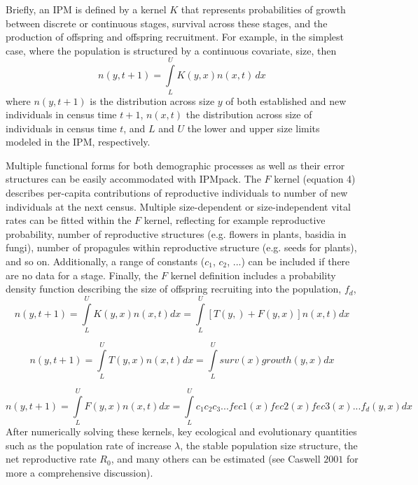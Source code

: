 \documentclass{article}
\begin{document}
Briefly, an IPM is defined by a kernel $K$ that represents probabilities of growth between discrete or continuous stages, survival across these stages, and the production of offspring and offspring recruitment.   For example, in the simplest case, where the population is structured by a continuous covariate, size, then 
\begin{equation}
n(y, t+1) = \int\limits_{L}^{U} K(y, x) n(x, t) \, dx       
\end{equation}
where $n(y, t+1)$ is the distribution across size $y$ of both established and new individuals in census time $t+1$, $n(x, t)$ the distribution across size of individuals in census time $t$, and $L$ and $U$ the lower and upper size limits modeled in the IPM, respectively. 

 Multiple functional forms for both demographic processes as well as their error structures can be easily accommodated with IPMpack. The $F$ kernel (equation 4) describes per-capita contributions of reproductive individuals to number of new individuals at the next census. Multiple size-dependent or size-independent vital rates can be fitted within the $F$ kernel, reflecting for example reproductive probability, number of reproductive structures (e.g. flowers in plants, basidia in fungi), number of propagules within reproductive structure (e.g. seeds for plants), and so on. Additionally, a range of constants ($c_1$, $c_2$, ...) can be included if there are no data for a stage.  Finally, the $F$ kernel definition includes a probability density function describing the size of offspring recruiting into the population, $f_d$, 
\begin{equation}
n(y, t+1) = \int\limits_{L}^{U} K(y, x) n(x, t) dx = \int\limits_{L}^{U}
[T(y, ) + F(y, x)] n(x, t) dx
\end{equation}

\begin{equation}
n(y, t+1) = \int\limits_{L}^{U} T(y, x) n(x, t) dx = \int\limits_{L}^{U}surv(x)growth(y, x)dx    
\end{equation}

\begin{equation}
n(y, t+1) = \int\limits_{L}^{U} F(y, x) n(x, t) dx = \int\limits_{L}^{U}
c_1 c_2 c_3 ... fec1(x)fec2(x)fec3(x)...f_d(y, x)dx     
\end{equation}
After numerically solving these kernels, key ecological and evolutionary quantities such as the population rate of increase $\lambda$, the stable population size structure, the net reproductive rate $R_0$, and many others can be estimated (see Caswell $2001$ for more a comprehensive discussion). 
\end{document}
